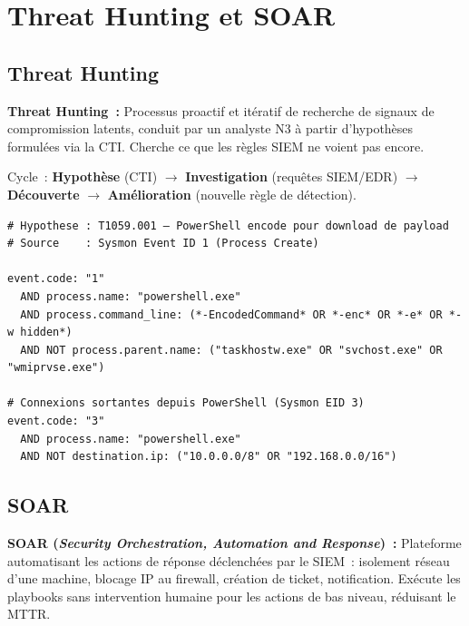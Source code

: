\section{Threat Hunting et SOAR}
\label{sec:hunting-soar}

\subsection{Threat Hunting}

\begin{boxdef}
\textbf{Threat Hunting~:} Processus proactif et itératif de recherche de signaux
de compromission latents, conduit par un analyste N3 à partir d'hypothèses
formulées via la CTI. Cherche ce que les règles SIEM ne voient pas encore.
\end{boxdef}

Cycle~: \textbf{Hypothèse} (CTI) $\to$ \textbf{Investigation} (requêtes SIEM/EDR)
$\to$ \textbf{Découverte} $\to$ \textbf{Amélioration} (nouvelle règle de détection).

\begin{lstlisting}[style=StyleTerminal,
  caption={Chasse aux PowerShell encodés --- requête KQL Kibana},
  label={lst:threat-hunt}]
# Hypothese : T1059.001 — PowerShell encode pour download de payload
# Source    : Sysmon Event ID 1 (Process Create)

event.code: "1"
  AND process.name: "powershell.exe"
  AND process.command_line: (*-EncodedCommand* OR *-enc* OR *-e* OR *-w hidden*)
  AND NOT process.parent.name: ("taskhostw.exe" OR "svchost.exe" OR "wmiprvse.exe")

# Connexions sortantes depuis PowerShell (Sysmon EID 3)
event.code: "3"
  AND process.name: "powershell.exe"
  AND NOT destination.ip: ("10.0.0.0/8" OR "192.168.0.0/16")
\end{lstlisting}

\subsection{SOAR}

\begin{boxdef}
\textbf{SOAR (\textit{Security Orchestration, Automation and Response})~:}
Plateforme automatisant les actions de réponse déclenchées par le SIEM~:
isolement réseau d'une machine, blocage IP au firewall, création de ticket,
notification. Exécute les playbooks sans intervention humaine pour les
actions de bas niveau, réduisant le MTTR.
\end{boxdef}

